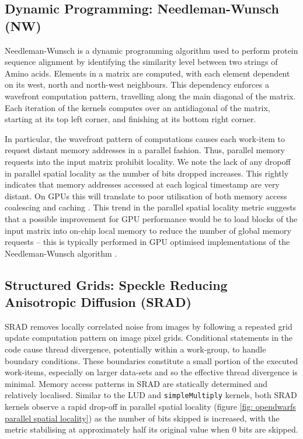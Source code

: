 \documentclass[review=false, sigchi]{acmart}
\begin{document}
	\subsection{Dynamic Programming: Needleman-Wunsch (NW)}
	
	Needleman-Wunsch is a dynamic programming algorithm used to perform protein sequence alignment by identifying the similarity level between two strings of Amino acids. Elements in a matrix are computed, with each element dependent on its west, north and north-west neighbours. This dependency enforces a wavefront computation pattern, travelling along the main diagonal of the matrix. Each iteration of the kernels computes over an antidiagonal of the matrix, starting at its top left corner, and finishing at its bottom right corner.
	
	In particular, the wavefront pattern of computations causes each work-item to request distant memory addresses in a parallel fashion. Thus, parallel memory requests into the input matrix prohibit locality. We note the lack of any dropoff in parallel spatial locality as the number of bits dropped increases. This rightly indicates that memory addresses accessed at each logical timestamp are very distant. On GPUs this will translate to poor utilisation of both memory access coalescing and caching \cite{krommydas2016opendwarfs}. This trend in the parallel spatial locality metric suggests that a possible improvement for GPU performance would be to load blocks of the input matrix into on-chip local memory to reduce the number of global memory requests -- this is typically performed in GPU optimised implementations of the Needleman-Wunsch algorithm \cite{opendwarfs2020head}. 
	
	\subsection{Structured Grids: Speckle Reducing Anisotropic Diffusion (SRAD)}
	
	SRAD removes locally correlated noise from images by following a repeated grid update computation pattern on image pixel grids. 
	Conditional statements in the code cause thread divergence, potentially within a work-group, to handle boundary conditions. 
	These boundaries constitute a small portion of the executed work-items, especially on larger data-sets and so the effective thread divergence is minimal.
	Memory access patterns in SRAD are statically determined and relatively localised. 
	Similar to the LUD and \texttt{simpleMultiply} kernels, both SRAD kernels observe a rapid drop-off in parallel spatial locality (figure \ref{fig: opendwarfs parallel spatial locality}) as the number of bits skipped is increased, with the metric stabilising at approximately half its original value when 0 bits are skipped.
	
\end{document}
